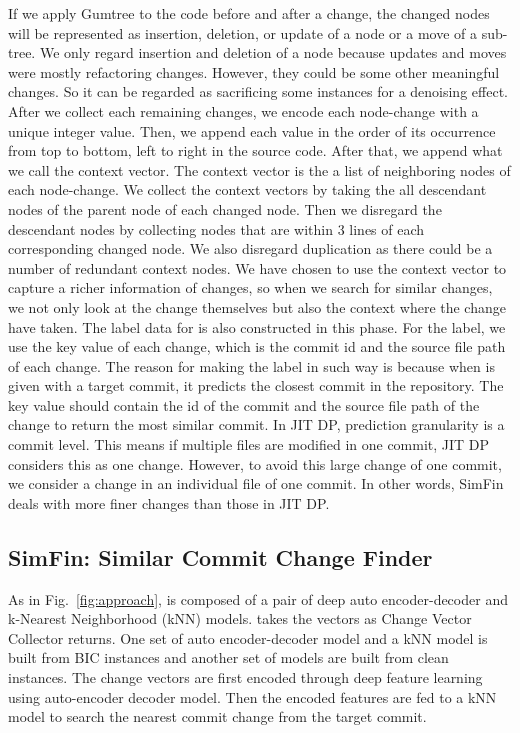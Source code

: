     If we apply Gumtree to the code before and after a change, the changed nodes will be represented as insertion, deletion, or update of a node or a move of a sub-tree.
    We only regard insertion and deletion of a node because updates and moves were mostly refactoring changes.
    However, they could be some other meaningful changes.
    So it can be regarded as sacrificing some instances for a denoising effect.
    After we collect each remaining changes, we encode each node-change with a unique integer value. 
    Then, we append each value in the order of its occurrence from top to bottom, left to right in the source code.
    After that, we append what we call the context vector.
    The context vector is the a list of neighboring nodes of each node-change.
    We collect the context vectors by taking the all descendant nodes of the parent node of each changed node.
    Then we disregard the descendant nodes by collecting nodes that are within 3 lines of each corresponding changed node.
    We also disregard duplication as there could be a number of redundant context nodes.
    We have chosen to use the context vector to capture a richer information of changes, so when we search for similar changes, we not only look at the change themselves but also the context where the change have taken.
    The label data for {\simfin} is also constructed in this phase.
    For the label, we use the key value of each change, which is the commit id and the source file path of each change. 
    The reason for making the label in such way is because when {\simfin} is given with a target commit, it predicts the closest commit in the repository.
    The key value should contain the id of the commit and the source file path of the change to return the most similar commit. In JIT DP, prediction granularity is a commit level. This means if multiple files are modified in one commit, JIT DP considers this as one change. However, to avoid this large change of one commit, we consider a change in an individual file of one commit. In other words, SimFin deals with more finer changes than those in JIT DP.
    
    \subsection{SimFin: Similar Commit Change Finder}
    As in Fig.~\ref{fig:approach}, {\simfin} is composed of a pair of deep auto encoder-decoder and k-Nearest Neighborhood (kNN) models. {\simfin} takes the vectors as Change Vector Collector returns.
    One set of auto encoder-decoder model and a kNN model is built from BIC instances and another set of models are built from clean instances. 
    The change vectors are first encoded through deep feature learning using auto-encoder decoder model.
    Then the encoded features are fed to a kNN model to search the nearest commit change from the target commit.
    
